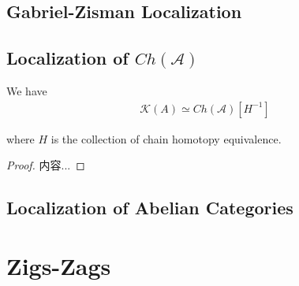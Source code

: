 \documentclass[total.tex]{subfiles}
\begin{document}
			\subsection{Gabriel-Zisman Localization}
			\subsection{Localization of $Ch(\mathcal{A})$}
				\begin{proposition}
					We have
					\begin{gather*}
						\mathcal{K}(A)\simeq Ch(\mathcal{A})[H^{-1}]
					\end{gather*}
					
					where $H$ is the collection of chain homotopy equivalence.
				\end{proposition}
				\begin{proof}
					内容...
				\end{proof}
			\subsection{Localization of Abelian Categories}
		\section{Zigs-Zags}
\end{document}
